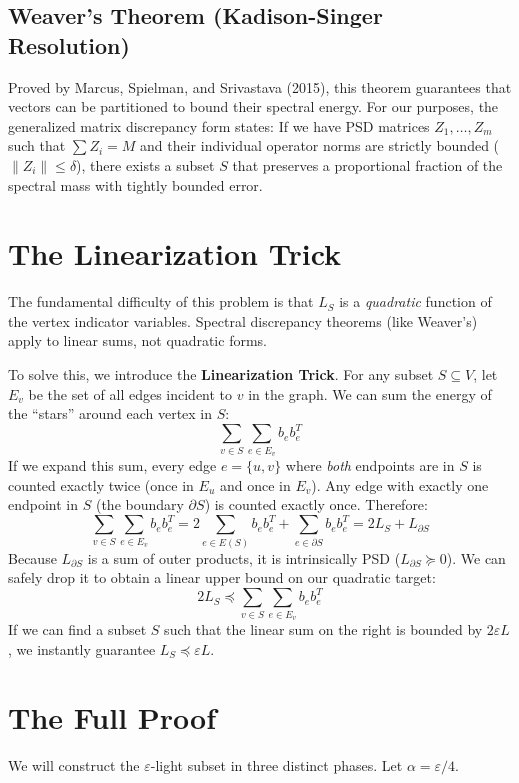\documentclass[12pt]{article}
\begin{document}
\subsection{Weaver's Theorem (Kadison-Singer Resolution)}
Proved by Marcus, Spielman, and Srivastava (2015), this theorem guarantees that vectors can be partitioned to bound their spectral energy. For our purposes, the generalized matrix discrepancy form states: If we have PSD matrices $Z_1, \dots, Z_m$ such that $\sum Z_i = M$ and their individual operator norms are strictly bounded ($\|Z_i\| \le \delta$), there exists a subset $S$ that preserves a proportional fraction of the spectral mass with tightly bounded error.

\section{The Linearization Trick}

The fundamental difficulty of this problem is that $L_S$ is a \emph{quadratic} function of the vertex indicator variables. Spectral discrepancy theorems (like Weaver's) apply to linear sums, not quadratic forms.

To solve this, we introduce the \textbf{Linearization Trick}. 
For any subset $S \subseteq V$, let $E_v$ be the set of all edges incident to $v$ in the graph. We can sum the energy of the ``stars'' around each vertex in $S$:
\[
\sum_{v \in S} \sum_{e \in E_v} b_e b_e^T
\]
If we expand this sum, every edge $e = \{u,v\}$ where \emph{both} endpoints are in $S$ is counted exactly twice (once in $E_u$ and once in $E_v$). Any edge with exactly one endpoint in $S$ (the boundary $\partial S$) is counted exactly once. Therefore:
\[
\sum_{v \in S} \sum_{e \in E_v} b_e b_e^T = 2 \sum_{e \in E(S)} b_e b_e^T + \sum_{e \in \partial S} b_e b_e^T = 2 L_S + L_{\partial S}
\]
Because $L_{\partial S}$ is a sum of outer products, it is intrinsically PSD ($L_{\partial S} \succeq 0$). We can safely drop it to obtain a linear upper bound on our quadratic target:
\[
2 L_S \preceq \sum_{v \in S} \sum_{e \in E_v} b_e b_e^T
\]
If we can find a subset $S$ such that the linear sum on the right is bounded by $2\varepsilon L$, we instantly guarantee $L_S \preceq \varepsilon L$.

\section{The Full Proof}

We will construct the $\varepsilon$-light subset in three distinct phases. Let $\alpha = \varepsilon / 4$.
\end{document}
